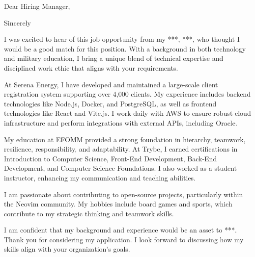 \documentclass[12pt,a4paper,sans]{moderncv}
\begin{document}
\date{25 June 2024}
\opening{Dear Hiring Manager,}
\closing{Sincerely}
\makelettertitle

I was excited to hear of this job opportunity from my ***,
***, who thought I would be a good match for this position.
With a background in both technology and military education, I bring
a unique blend of technical expertise and disciplined work ethic that
aligns with your requirements.

At Serena Energy, I have developed and maintained a large-scale
client registration system supporting over 4,000 clients. My
experience includes backend technologies like Node.js, Docker, and
PostgreSQL, as well as frontend technologies like React and Vite.js.
I work daily with AWS to ensure robust cloud infrastructure and
perform integrations with external APIs, including Oracle.

My education at EFOMM provided a strong foundation in hierarchy,
teamwork, resilience, responsibility, and adaptability. At Trybe, I
earned certifications in Introduction to Computer Science, Front-End
Development, Back-End Development, and Computer Science Foundations.
I also worked as a student instructor, enhancing my communication and
teaching abilities.

I am passionate about contributing to open-source projects,
particularly within the Neovim community. My hobbies include board
games and sports, which contribute to my strategic thinking and teamwork skills.

I am confident that my background and experience would be an asset to
***. Thank you for considering my application. I look forward
to discussing how my skills align with your organization's goals.

\makeletterclosing
\end{document}
